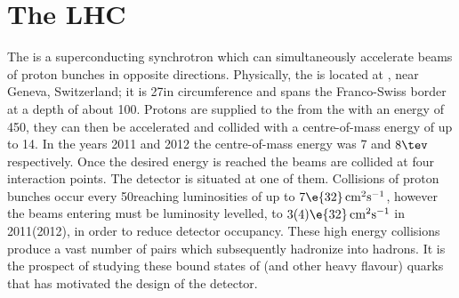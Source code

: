 \section{The LHC}
The \lhc is a superconducting synchrotron which can simultaneously accelerate beams of proton bunches
in opposite directions.
Physically, the \lhc is located at \cern, near Geneva, Switzerland; it is 27\km in
circumference and spans the Franco-Swiss border at a depth of about 100\m.
Protons are supplied to the \lhc from the \sps with an energy of 450\gev, they can then
be accelerated and collided with a centre-of-mass energy of up to 14\tev.
In the years 2011 and 2012 the centre-of-mass energy was 7 and $8\tev$ respectively.
Once the desired energy is reached the beams are collided at four interaction points.
The \lhcb detector is
situated at one of them.
Collisions of proton bunches occur every 50\ns reaching luminosities of up to
$7\e{32}\,\mathrm{cm}^{2}\mathrm{s}^{-1}$, however the beams entering \lhcb must be luminosity
levelled, to $3(4)\e{32}\,\mathrm{cm}^{2}\mathrm{s}^{-1}$ in 2011(2012), in order to reduce
detector occupancy.
These high energy collisions produce a vast number of \bbbar pairs which subsequently hadronize
into \bquark hadrons.
It is the prospect of studying these bound states of \bquark (and other heavy
flavour) quarks that has motivated the design of the \lhcb detector.


